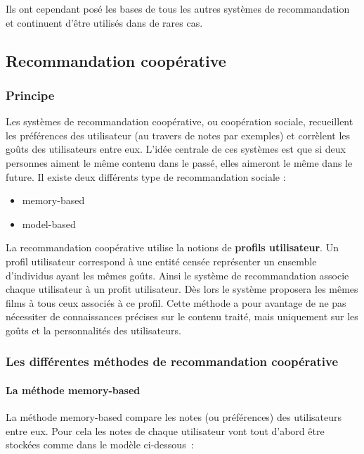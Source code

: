 \documentclass{article}
\begin{document}
Ils ont cependant posé les bases de tous les autres systèmes de recommandation et continuent d'être utilisés dans de rares cas.

\subsection{Recommandation coopérative}
\subsubsection{Principe}
Les systèmes de recommandation coopérative, ou coopération sociale, recueillent les préférences des utilisateur (au travers de notes par exemples) et corrèlent les goûts des utilisateurs entre eux. L'idée centrale de ces systèmes est que si deux personnes aiment le même contenu dans le passé, elles aimeront le même dans le future.
Il existe deux différents type de recommandation sociale :

\begin{itemize}
    \item memory-based
    \item model-based
\end{itemize}

La recommandation coopérative utilise la notions de \textbf{profils utilisateur}.
Un profil utilisateur correspond à une entité censée représenter un ensemble d'individus ayant les mêmes goûts. Ainsi le système de recommandation associe chaque utilisateur à un profit utilisateur. Dès lors le système proposera les mêmes films à tous ceux associés à ce profil. Cette méthode a pour avantage de ne pas nécessiter de connaissances précises sur le contenu traité, mais uniquement sur les goûts et la personnalités des utilisateurs.

\subsubsection{Les différentes méthodes de recommandation coopérative}
\paragraph{La méthode memory-based}

La méthode memory-based compare les notes (ou préférences) des utilisateurs entre eux. Pour cela les notes de chaque utilisateur vont tout d'abord être stockées comme dans le modèle ci-dessous~:
\end{document}

